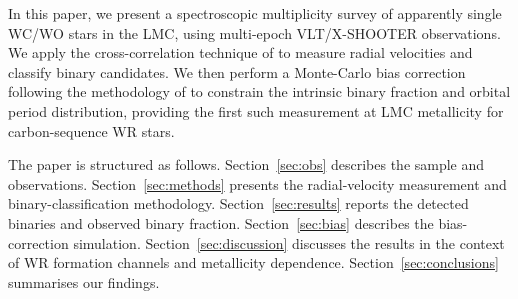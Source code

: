 In this paper, we present a spectroscopic multiplicity survey of \Nstars
apparently single WC/WO stars in the LMC, using multi-epoch VLT/X-SHOOTER
observations. We apply the cross-correlation technique of
\citet{Zucker1994} to measure radial velocities and classify binary
candidates. We then perform a Monte-Carlo bias correction following the
methodology of \citet{Dsilva2023} to constrain the intrinsic binary
fraction and orbital period distribution, providing the first such
measurement at LMC metallicity for carbon-sequence WR stars.

The paper is structured as follows. Section~\ref{sec:obs} describes the
sample and observations. Section~\ref{sec:methods} presents the
radial-velocity measurement and binary-classification methodology.
Section~\ref{sec:results} reports the detected binaries and observed binary
fraction. Section~\ref{sec:bias} describes the bias-correction simulation.
Section~\ref{sec:discussion} discusses the results in the context of WR
formation channels and metallicity dependence.
Section~\ref{sec:conclusions} summarises our findings.
